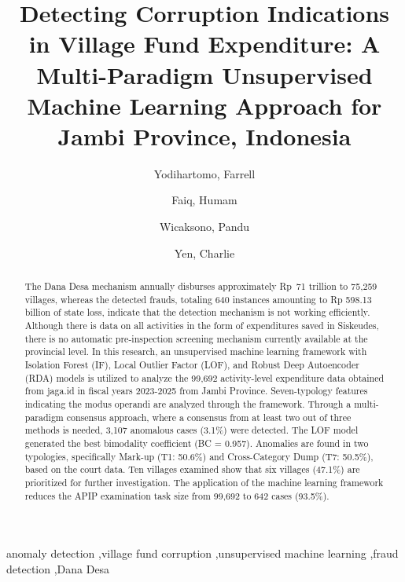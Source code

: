 \documentclass[3p,times,procedia]{elsarticle}
\begin{document}
\begin{frontmatter}


\title{Detecting Corruption Indications in Village Fund Expenditure: A Multi-Paradigm Unsupervised Machine Learning Approach for Jambi Province, Indonesia}

\author[a]{Yodihartomo, Farrell}
\author[b]{Faiq, Humam}
\author[a]{Wicaksono, Pandu}
\author[a]{Yen, Charlie}
\address[a]{Bina Nusantara University}
\address[b]{Komisi Pemberantasan Korupsi}

\begin{abstract}
The Dana Desa mechanism annually disburses approximately Rp~71 trillion to 75,259 villages, whereas the detected frauds, totaling 640 instances amounting to Rp 598.13 billion of state loss, indicate that the detection mechanism is not working efficiently. Although there is data on all activities in the form of expenditures saved in Siskeudes, there is no automatic pre-inspection screening mechanism currently available at the provincial level. In this research, an unsupervised machine learning framework with Isolation Forest (IF), Local Outlier Factor (LOF), and Robust Deep Autoencoder (RDA) models is utilized to analyze the 99,692 activity-level expenditure data obtained from jaga.id in fiscal years 2023-2025 from Jambi Province. Seven-typology features indicating the modus operandi are analyzed through the framework. Through a multi-paradigm consensus approach, where a consensus from at least two out of three methods is needed, 3,107 anomalous cases (3.1\%) were detected. The LOF model generated the best bimodality coefficient (BC = 0.957). Anomalies are found in two typologies, specifically Mark-up (T1: 50.6\%) and Cross-Category Dump (T7: 50.5\%), based on the court data. Ten villages examined show that six villages (47.1\%) are prioritized for further investigation. The application of the machine learning framework reduces the APIP examination task size from 99,692 to 642 cases (93.5\%).
\end{abstract}

\begin{keyword}
anomaly detection \sep village fund corruption \sep unsupervised machine learning \sep fraud detection \sep Dana Desa
\end{keyword}

\end{frontmatter}
\end{document}

